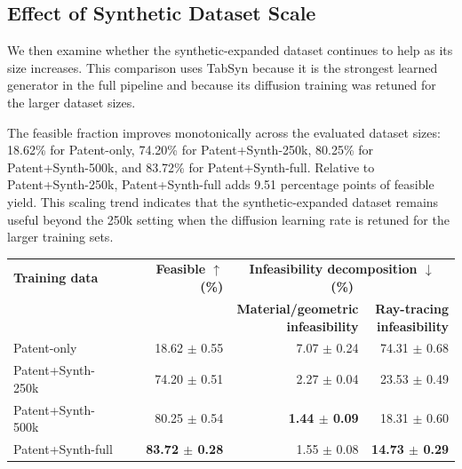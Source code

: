 \subsection{Effect of Synthetic Dataset Scale}
\label{sec:results_dataset_scale}

We then examine whether the synthetic-expanded dataset continues to help as its size increases. This comparison uses TabSyn because it is the strongest learned generator in the full pipeline and because its diffusion training was retuned for the larger dataset sizes.

The feasible fraction improves monotonically across the evaluated dataset sizes: 18.62\% for Patent-only, 74.20\% for Patent+Synth-250k, 80.25\% for Patent+Synth-500k, and 83.72\% for Patent+Synth-full. Relative to Patent+Synth-250k, Patent+Synth-full adds 9.51 percentage points of feasible yield. This scaling trend indicates that the synthetic-expanded dataset remains useful beyond the 250k setting when the diffusion learning rate is retuned for the larger training sets.

\begin{center}
\begin{minipage}{0.98\linewidth}
\centering
\scriptsize
\setlength{\tabcolsep}{4pt}
\label{tab:dataset_scale_results}
\begin{tabular}{lrrr}
\toprule
\textbf{Training data} & \textbf{Feasible $\uparrow$ (\%)} & \multicolumn{2}{c}{\textbf{Infeasibility decomposition $\downarrow$ (\%)}} \\
\cmidrule(lr){3-4}
 & & \shortstack{\textbf{Material/geometric}\\\textbf{infeasibility}} & \shortstack{\textbf{Ray-tracing}\\\textbf{infeasibility}} \\
\midrule
Patent-only & 18.62 \ensuremath{\pm} 0.55 & 7.07 \ensuremath{\pm} 0.24 & 74.31 \ensuremath{\pm} 0.68 \\
Patent+Synth-250k & 74.20 \ensuremath{\pm} 0.51 & 2.27 \ensuremath{\pm} 0.04 & 23.53 \ensuremath{\pm} 0.49 \\
Patent+Synth-500k & 80.25 \ensuremath{\pm} 0.54 & \textbf{1.44 \ensuremath{\pm} 0.09} & 18.31 \ensuremath{\pm} 0.60 \\
Patent+Synth-full & \textbf{83.72 \ensuremath{\pm} 0.28} & 1.55 \ensuremath{\pm} 0.08 & \textbf{14.73 \ensuremath{\pm} 0.29} \\
\bottomrule
\end{tabular}
\end{minipage}
\end{center}

